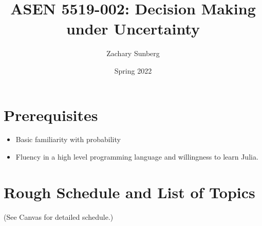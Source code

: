 \documentclass[9pt]{article}
\title{ASEN 5519-002: Decision Making under Uncertainty}
\author{Zachary Sunberg}
\date{Spring 2022}
\begin{document}
\maketitle

\section*{Prerequisites}

\begin{itemize}[nosep]
    \item Basic familiarity with probability
    \item Fluency in a high level programming language and willingness to learn Julia.
\end{itemize}

\section*{Rough Schedule and List of Topics}

(See Canvas for detailed schedule.)
\end{document}
